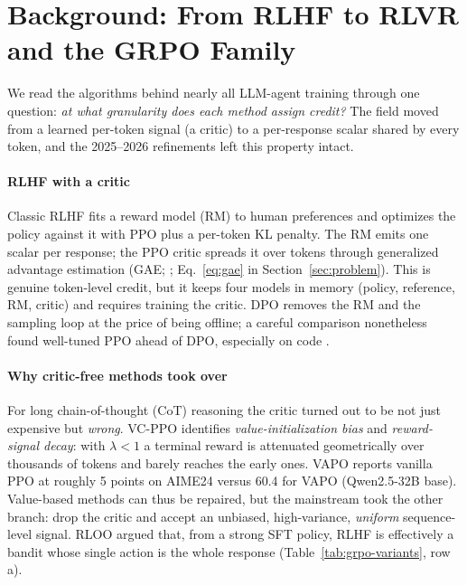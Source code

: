\section{Background: From RLHF to RLVR and the GRPO Family}\label{sec:background}

We read the algorithms behind nearly all LLM-agent training through one question: \emph{at what granularity does each method assign credit?} The field moved from a learned per-token signal (a critic) to a per-response scalar shared by every token, and the 2025--2026 refinements left this property intact.

\paragraph{RLHF with a critic}
Classic RLHF \citep{christiano2017deep,ouyang2022training} fits a reward model (RM) to human preferences and optimizes the policy against it with PPO \citep{schulman2017proximal} plus a per-token KL penalty. The RM emits one scalar per response; the PPO critic spreads it over tokens through generalized advantage estimation (GAE; \citealp{schulman2015high}; Eq.~\ref{eq:gae} in Section~\ref{sec:problem}). This is genuine token-level credit, but it keeps four models in memory (policy, reference, RM, critic) and requires training the critic. DPO \citep{rafailov2023direct} removes the RM and the sampling loop at the price of being offline; a careful comparison nonetheless found well-tuned PPO ahead of DPO, especially on code \citep{xu2024dpo}\unverified.

\paragraph{Why critic-free methods took over}
For long chain-of-thought (CoT) reasoning the critic turned out to be not just expensive but \emph{wrong}. VC-PPO \citep{yuan2025whats} identifies \emph{value-initialization bias} and \emph{reward-signal decay}: with $\lambda<1$ a terminal reward is attenuated geometrically over thousands of tokens and barely reaches the early ones. VAPO \citep{yue2025vapo} reports vanilla PPO at roughly 5 points on AIME24 versus 60.4 for VAPO (Qwen2.5-32B base). Value-based methods can thus be repaired, but the mainstream took the other branch: drop the critic and accept an unbiased, high-variance, \emph{uniform} sequence-level signal. RLOO \citep{ahmadian2024back} argued that, from a strong SFT policy, RLHF is effectively a bandit whose single action is the whole response\unverified{} (Table~\ref{tab:grpo-variants}, row a).


